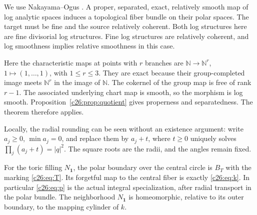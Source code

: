We use Nakayama--Ogus \cite[Theorem 5.1]{CuspNO}.
A proper, separated, exact, relatively smooth map of log analytic
spaces induces a topological fiber bundle on their polar spaces.
The target must be fine and the source relatively coherent.
Both log structures here are fine divisorial log structures.
Fine log structures are relatively coherent, and log smoothness
implies relative smoothness in this case.

Here the characteristic maps at points with $r$ branches are
$\mathbb N\to\mathbb N^r$, $1\mapsto(1,\ldots,1)$, with $1\le r\le3$.
They are exact because their group-completed image meets
$\mathbb N^r$ in the image of $\mathbb N$.
The cokernel of the group map is free of rank $r-1$.
The associated underlying chart map is smooth, so the morphism is log smooth.
Proposition~\ref{c26:prop:quotient}
gives properness and separatedness. The theorem therefore applies.

Locally, the radial rounding can be seen without an existence argument:
write $a_j\ge0$, $\min a_j=0$, and replace them by $a_j+t$,
where $t\ge0$ uniquely solves $\prod_j(a_j+t)=|q|^2$.
The square roots are the radii, and the angles remain fixed.

\begin{theorem}\label{c26:thm:actual}
For the toric filling $N_{\mathbf1}$, the polar boundary over the central
circle is $B_T$ with the marking \eqref{c26:eq:T}.
Its forgetful map to the central fiber is exactly \eqref{c26:eq:k}.
In particular \eqref{c26:eq:p} is the actual integral specialization,
after radial transport in the polar bundle.
The neighborhood $N_{\mathbf1}$ is homeomorphic, relative to its outer boundary,
to the mapping cylinder of $k$.
\end{theorem}

